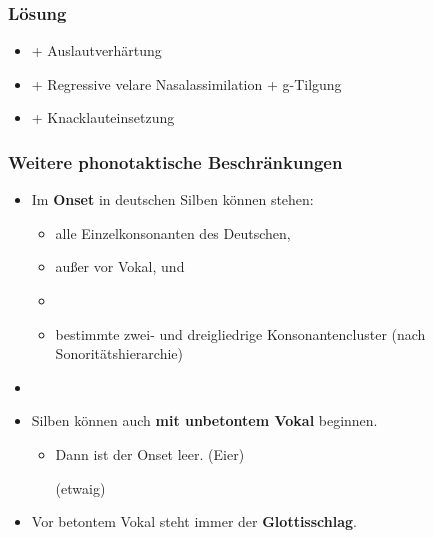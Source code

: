 \begin{frame}
	\frametitle{Lösung}
	\begin{itemize}
		\item {} \ras + Auslautverhärtung
		\item {} \ras + Regressive velare Nasalassimilation + g-Tilgung
		\item {} \ras + Knacklauteinsetzung
	\end{itemize}
\end{frame}

\begin{frame}
\frametitle{Weitere phonotaktische Beschränkungen}

\begin{itemize}
	\item Im \textbf{Onset} in deutschen Silben können stehen:

	\begin{itemize}
		\item alle Einzelkonsonanten des Deutschen,
		\item außer \textipa{[s]} vor Vokal, und \textipa{[N]}
		\item[]
		\item bestimmte zwei- und dreigliedrige Konsonantencluster (nach Sonoritätshierarchie)
	\end{itemize}
	
	\item[]

	\item Silben können auch \textbf{mit unbetontem Vokal} beginnen.

	\begin{itemize}
		\item Dann ist der Onset leer.
		  \ea
                  \textipa{[\textprimstress P\t{aɪ}.5]} (Eier)
                  \z

		  \ea
                   (etwaig)
                  \z
	
	\end{itemize}
	
	\item Vor betontem Vokal steht immer der \textbf{Glottisschlag}.

	  \ea
          \z

\end{itemize}

\end{frame}



